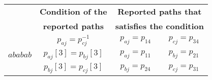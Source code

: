 \small
\begin{tabular}{|c| c |c|c|}
\hline
\rowcolor{gray!30}&\multirow{1}{*}{{\textbf{Condition of the}}}&\multicolumn{2}{c|}{\multirow{1}{*}{{\textbf{Reported paths that} }}}\\
\rowcolor{gray!30}\multirow{-2}{*}{{\textbf{Relator}}}&\multirow{1}{*}{{\textbf{reported paths}}}&\multicolumn{2}{c|}{\multirow{1}{*}{{\textbf{satisfies the condition}}}}\\
\hline
\hline
\rowcolor{gray!10}\multirow{1}{*}{$acac$}&\multirow{1}{*}{$p_{aj}=p_{cj}^{-1}$}&\multirow{1}{*}{$p_{aj}=p_{14}$}&\multirow{1}{*}{$p_{cj}=p_{34}$}\\
\multirow{1}{*}{$ababab$}&\multirow{1}{*}{$p_{aj}[3]=p_{bj}[3]$}&\multirow{1}{*}{$p_{aj}=p_{11}$}&\multirow{1}{*}{$p_{bj}=p_{21}$}\\
\rowcolor{gray!10}\multirow{1}{*}{$bcbcbc$}&\multirow{1}{*}{$p_{bj}[3]=p_{cj}[3]$}&\multirow{1}{*}{$p_{bj}=p_{24}$}&\multirow{1}{*}{$p_{cj}=p_{31}$}\\
\hline
\end{tabular}